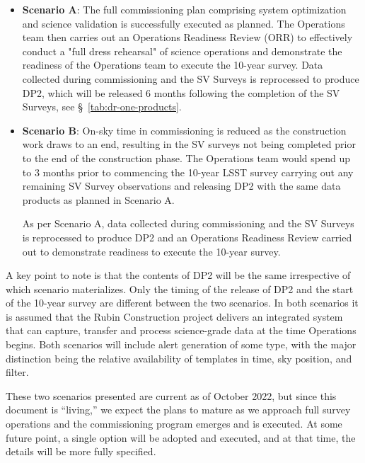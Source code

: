 \begin{itemize}
\item \textbf{Scenario A}:
The full commissioning plan comprising system optimization and science validation is successfully executed as planned. 
The Operations team then carries out an Operations Readiness Review (ORR) to effectively conduct a "full dress rehearsal" of science operations and demonstrate the readiness of the Operations team to execute the 10-year survey. 
Data collected during commissioning and the SV Surveys is reprocessed to produce DP2, which will be released 6 months following the completion of the SV Surveys, see \S~\ref{tab:dr-one-products}.

\item \textbf{Scenario B}:
On-sky time in commissioning is reduced as the construction work  draws to an end, resulting in the SV surveys not being completed prior to the end of the construction phase.  
The Operations team would spend up to 3 months prior to commencing the 10-year LSST survey carrying out any remaining SV Survey observations and releasing DP2 with the same data products as planned in Scenario A.

As per Scenario A, data collected during commissioning and the SV Surveys is reprocessed to produce DP2 and an Operations Readiness Review carried out to demonstrate readiness to execute the 10-year survey. 

\end{itemize}

A key point to note is that the contents of DP2 will be the same irrespective of which scenario materializes.  
Only the timing of the release of DP2 and the start of the 10-year survey are different between the two scenarios. 
In both scenarios it is assumed that the Rubin Construction project delivers an integrated system that can capture, transfer and process science-grade data at the time Operations begins.
Both scenarios will include alert generation of some type, with the major distinction being the relative availability of templates in time, sky position, and filter.


These two scenarios presented are current as of October 2022, but since this document is ``living,'' we expect the plans to mature as we approach full survey operations and the commissioning program emerges and is executed.
At some future point, a single option will be adopted and executed, and at that time, the details will be more fully specified.
